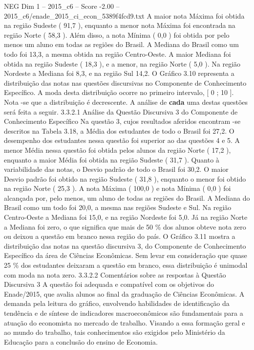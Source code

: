 \begin{textsample}{NEG Dim 1 – 2015\_c6 – Score -2.00 – 2015\_c6/enade\_2015\_ci\_econ\_5389f4fcd9.txt}
A maior nota Máxima foi obtida na região Sudeste ( 91,7 ), enquanto a menor nota Máxima foi encontrada na região Norte ( 58,3 ).
Além disso, a nota Mínima ( 0,0 ) foi obtida por pelo menos um aluno em todas as regiões do Brasil.
A Mediana do Brasil como um todo foi 13,3, a mesma obtida na região Centro-Oeste.
A maior Mediana foi obtida na região Sudeste ( 18,3 ), e a menor, na região Norte ( 5,0 ).
Na região Nordeste a Mediana foi 8,3, e na região Sul 14,2.
O Gráfico 3.10 representa a distribuição das notas nas questões discursivas no Componente de Conhecimento Específico.
A moda desta distribuição ocorre no primeiro intervalo, [ 0 ; 10 ].
Nota -se que a distribuição é decrescente.
A análise de \textbf{cada} uma destas questões será feita a seguir. 3.3.2.1 Análise da Questão Discursiva 3 do Componente de Conhecimento Específico Na questão 3, cujos resultados aferidos encontram -se descritos na Tabela 3.18, a Média dos estudantes de todo o Brasil foi 27,2.
O desempenho dos estudantes nessa questão foi superior ao das questões 4 e 5.
A menor Média nessa questão foi obtida pelos alunos da região Norte ( 17,2 ), enquanto a maior Média foi obtida na região Sudeste ( 31,7 ).
Quanto à variabilidade das notas, o Desvio padrão de todo o Brasil foi 30,2.
O maior Desvio padrão foi obtido na região Sudeste ( 31,8 ), enquanto o menor foi obtido na região Norte ( 25,3 ).
A nota Máxima ( 100,0 ) e nota Mínima ( 0,0 ) foi alcançada por, pelo menos, um aluno de todas as regiões do Brasil.
A Mediana do Brasil como um todo foi 20,0, a mesma nas regiões Sudeste e Sul.
Na região Centro-Oeste a Mediana foi 15,0, e na região Nordeste foi 5,0.
Já na região Norte a Mediana foi zero, o que significa que mais de 50 \% dos alunos obteve nota zero ou deixou a questão em branco nessa região do país.
O Gráfico 3.11 mostra a distribuição das notas na questão discursiva 3, do Componente de Conhecimento Específico da área de Ciências Econômicas.
Sem levar em consideração que quase 25 \% dos estudantes deixaram a questão em branco, essa distribuição é unimodal com moda na nota zero. 3.3.2.2 Comentários sobre as respostas à Questão Discursiva 3 A questão foi adequada e compatível com os objetivos do Enade/2015, que avalia alunos ao final da graduação de Ciências Econômicas.
A demanda pela leitura do gráfico, envolvendo habilidades de identificação da tendência e de síntese de indicadores macroeconômicos são fundamentais para a atuação do economista no mercado de trabalho.
Visando a essa formação geral e ao mundo do trabalho, tais conhecimentos são exigidos pelo Ministério da Educação para a conclusão do ensino de Economia.

\end{textsample}
